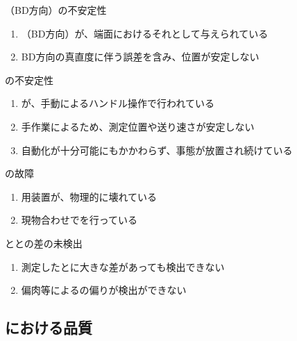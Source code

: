 \begin{Issues}{\KeywayCenterMeasurement（BD方向）の不安定性}
\begin{enumerate}[label=\sarrow]
\item[{\sarrow[red]}]\KeywayCenter（BD方向）が、端面におけるそれとして与えられている
\item[{\sarrow[red]}]BD方向の真直度に伴う誤差を含み、位置が安定しない
\end{enumerate}
\end{Issues}

\begin{Issues}{\CenterlineEndFaceDifMeasurement の不安定性}
\begin{enumerate}[label=\sarrow]
\item[{\sarrow[red]}]\CenterlineEndFaceDifMeasurement が、手動によるハンドル操作で行われている
\item[{\sarrow[red]}]手作業によるため、測定位置や送り速さが安定しない
\item[{\sarrow[red]}]自動化が十分可能にもかかわらず、事態が放置され続けている
\end{enumerate}
\end{Issues}

\begin{Issues}{\TLMeasurement の故障}
\begin{enumerate}[label=\sarrow]
\item\TLMeasurement 用装置が、物理的に壊れている
\item 現物合わせで\TLMeasurement を行っている
\end{enumerate}
\end{Issues}

\begin{Issues}{\TopOutcutCenter と\BottomOutcutCenter との差の未検出}
\begin{enumerate}[label=\sarrow]
\item[{\sarrow[red]}]測定した\TopOutcutCenter と\BottomOutcutCenter に大きな差があっても検出できない
\item[{\sarrow[red]}]偏肉等による\OutcutCenter の偏りが検出ができない
\end{enumerate}
\end{Issues}


\subsection{\OutcutMilling における品質}

